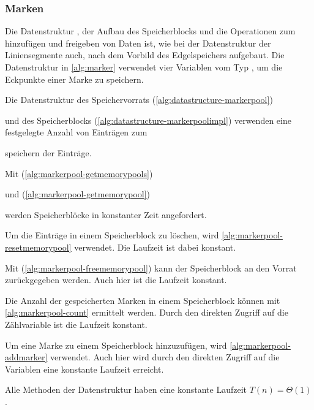 \subsubsection{Marken} %
\label{sub:marken}

Die Datenstruktur , der Aufbau des Speicherblocks und die Operationen zum hinzufügen und freigeben von
 Daten ist, wie bei der Datenstruktur der Liniensegmente auch, nach dem Vorbild des Edgelspeichers aufgebaut. Die
 Datenstruktur in \autoref{alg:marker} verwendet vier Variablen vom Typ , um die Eckpunkte einer Marke
 zu speichern.


Die Datenstruktur des Speichervorrats (\autoref{alg:datastructure-markerpool})

und des Speicherblocks (\autoref{alg:datastructure-markerpoolimpl}) verwenden eine festgelegte Anzahl von Einträgen zum

speichern der Einträge.

Mit  (\autoref{alg:markerpool-getmemorypools})

und  (\autoref{alg:markerpool-getmemorypool})

werden Speicherblöcke in konstanter Zeit angefordert.

Um die Einträge in einem Speicherblock zu löschen, wird \autoref{alg:markerpool-resetmemorypool} verwendet. Die
 Laufzeit ist dabei konstant.


Mit  (\autoref{alg:markerpool-freememorypool}) kann der Speicherblock an den Vorrat
 zurückgegeben werden. Auch hier ist die Laufzeit konstant.


Die Anzahl der gespeicherten Marken in einem Speicherblock können mit \autoref{alg:markerpool-count} ermittelt werden.
 Durch den direkten Zugriff auf die Zählvariable ist die Laufzeit konstant.


Um eine Marke zu einem Speicherblock hinzuzufügen, wird \autoref{alg:markerpool-addmarker} verwendet. Auch hier wird durch den direkten Zugriff auf die Variablen eine konstante Laufzeit erreicht.


Alle Methoden der Datenstruktur  haben eine konstante Laufzeit $T(n)=\Theta(1)$.
